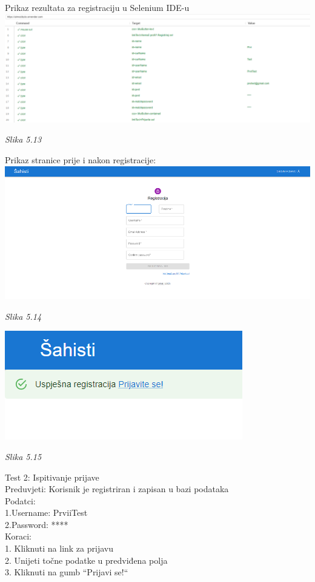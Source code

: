 \documentclass{article}
\begin{document}
	Prikaz rezultata za registraciju u Selenium IDE-u\\
	
	\includegraphics[width=\columnwidth]{registracija}
	\begin{center}
		\textit{Slika 5.13}
	\end{center}
	\eject
	Prikaz stranice prije i nakon registracije:\\
	
	\includegraphics[width=\columnwidth]{registracija-prije}
	\begin{center}
		\textit{Slika 5.14}
	\end{center}
	\includegraphics[width=\columnwidth]{registracija-nakon}
	\begin{center}
		\textit{Slika 5.15}
	\end{center}
	\eject
	Test 2: Ispitivanje prijave\\
	Preduvjeti: Korisnik je registriran i zapisan u bazi podataka\\
	Podatci: \\
	1.Username: PrviiTest\\
	2.Password: ****\\
	Koraci:\\
	1. Kliknuti na link za prijavu\\
	2. Unijeti točne podatke u predviđena polja\\
	3. Kliknuti na gumb “Prijavi se!“\\
	
\end{document}
